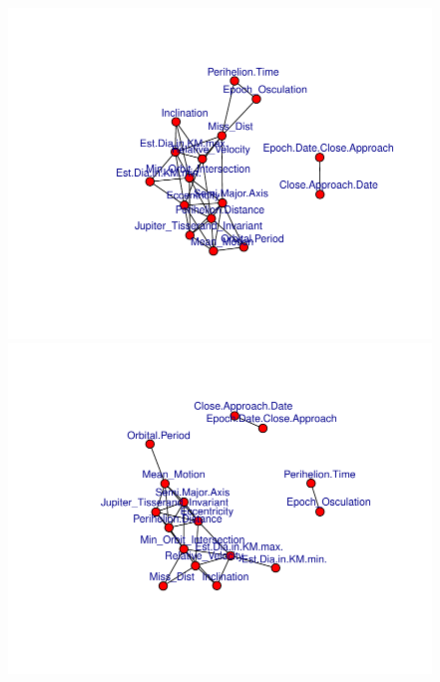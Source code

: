 \documentclass[12pt,%
               a4paper,%
               oneside,openany,%
               titlepage,%
               headinclude,footinclude,%
               BCOR5mm,%
               cleardoublepage=empty,%
               tablecaptionabove,%
               floatperchapter,
               ]{scrreprt}                 %
\begin{document}
\begin{figure}[ht]
  \begin{minipage}[b]{0.5\linewidth}
    \centering
    \includegraphics[width=.9\linewidth]{Figures/GLASSO_0.1.pdf}
    \vspace{4ex}
  \end{minipage} 
  \begin{minipage}[b]{0.5\linewidth}
    \centering
    \includegraphics[width=.9\linewidth]{Figures/GLASSO_0.2.pdf}
    \vspace{4ex}
  \end{minipage} \\
  \begin{minipage}[b]{0.5\linewidth}
    \centering

\end{minipage}
\end{figure}
\end{document}
